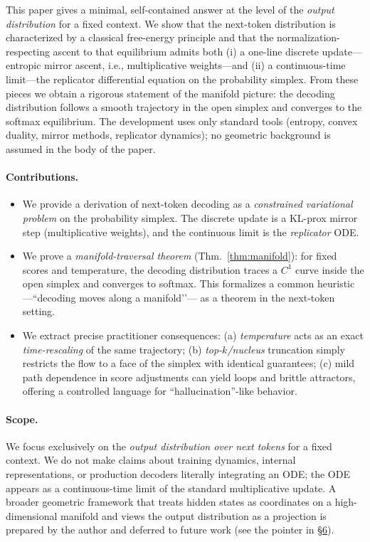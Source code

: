 \documentclass[10pt,a4paper]{amsart}
\numberwithin{equation}{section}
\theoremstyle{plain}
\theoremstyle{definition}
\theoremstyle{remark}
\newcommand{\1}{\mathbbm{1}}
\begin{document}
This paper gives a minimal, self-contained answer at the level of the \emph{output distribution}
for a fixed context. We show that the next-token distribution is characterized by a classical
free-energy principle and that the normalization-respecting ascent to that equilibrium admits
both (i) a one-line discrete update—entropic mirror ascent, i.e., multiplicative weights—and
(ii) a continuous-time limit—the replicator differential equation on the probability simplex.
From these pieces we obtain a rigorous statement of the manifold picture: the decoding
distribution follows a smooth trajectory in the open simplex and converges to the softmax
equilibrium. The development uses only standard tools (entropy, convex duality, mirror
methods, replicator dynamics); no geometric background is
assumed in the body of the paper.

\paragraph{Contributions.}
\begin{itemize}
\item We provide a derivation of next-token decoding as a \emph{constrained
variational problem} on the probability simplex. The discrete update is a KL-prox mirror step
(multiplicative weights), and the continuous limit is the \emph{replicator} ODE.
\item We prove a \emph{manifold-traversal theorem} (Thm.~\ref{thm:manifold}): for fixed scores and
temperature, the decoding distribution traces a $C^1$ curve inside the open simplex and
converges to softmax. This formalizes a common heuristic—``decoding moves along a manifold’’—
as a theorem in the next-token setting.
\item We extract precise practitioner consequences: (a) \emph{temperature} acts as an exact
\emph{time-rescaling} of the same trajectory; (b) \emph{top-$k$/nucleus} truncation simply
restricts the flow to a face of the simplex with identical guarantees; (c) mild path dependence
in score adjustments can yield loops and brittle attractors, offering a controlled language for
``hallucination''-like behavior.
\end{itemize}

\paragraph{Scope.}We focus exclusively on the \emph{output distribution over next tokens} for a fixed context.
We do not make claims about training dynamics, internal representations, or production decoders
literally integrating an ODE; the ODE appears as a continuous-time limit of the standard
multiplicative update. A broader geometric framework that treats hidden states as coordinates
on a high-dimensional manifold and views the output distribution as a projection is prepared by
the author and deferred to future work (see the pointer in \S\href{https://arxiv.org/abs/2508.21186v1}{6}).
\end{document}
